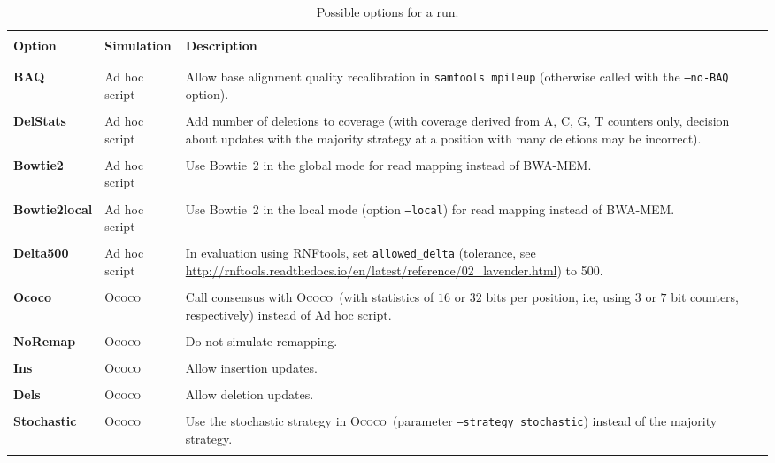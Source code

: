 \documentclass[11pt]{article}
\newcommand{\OC}{\textsc{Ococo}}
\newcommand{\AC}{Ad hoc script}
\begin{document}
\clearpage


\begin{table}[h!]
\begin{center}
\begin{tabular}{lp{3cm}p{9cm}}
\hline\\
\textbf{Option} & \textbf{Simulation} & \textbf{Description} \\
\\
\hline
\\
\textbf{BAQ} & \AC &
        Allow base alignment quality recalibration in \texttt{samtools mpileup} (otherwise called with the \texttt{--no-BAQ} option). 
        \\ \\
\textbf{DelStats} & \AC &
        Add number of deletions to coverage (with coverage derived from A, C, G, T counters only, decision about updates with the majority strategy at a position with many deletions may be incorrect).
        \\ \\
\textbf{Bowtie2} & \AC &
        Use Bowtie~2 in the global mode for read mapping instead of BWA-MEM.
        \\ \\
\textbf{Bowtie2local} & \AC &
        Use Bowtie~2 in the local mode (option \texttt{--local}) for read mapping instead of BWA-MEM.
        \\ \\
\textbf{Delta500} & \AC &
        In evaluation using RNFtools, set \texttt{allowed\_delta} (tolerance, see \url{http://rnftools.readthedocs.io/en/latest/reference/02_lavender.html}) to 500.
        \\ \\
\textbf{Ococo} & \OC &
        Call consensus with \OC~(with statistics of $16$ or $32$ bits per position, i.e, using $3$ or $7$ bit counters, respectively) instead of \AC.
        \\ \\
\textbf{NoRemap} & \OC &
        Do not simulate remapping.
        \\ \\
\textbf{Ins} & \OC &
        Allow insertion updates.
        \\ \\
\textbf{Dels} & \OC &
        Allow deletion updates.
        \\ \\
\textbf{Stochastic} & \OC &
        Use the stochastic strategy in \OC~(parameter \texttt{--strategy stochastic}) instead of the majority strategy.
        \\ \\
\end{tabular}
\end{center}
        \caption{
                Possible options for a run.
        }
        \label{tab:options}
\end{table}
\end{document}
